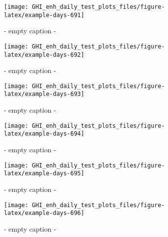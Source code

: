 \documentclass[
  10pt,
  a4paper,oneside]{article}
\begin{document}
\begin{figure}[H]

{\centering \texttt{[image: GHI\_enh\_daily\_test\_plots\_files/figure-latex/example-days-691]} 

}

\caption{ - empty caption - }\label{fig:example-days-691}
\end{figure}

\begin{figure}[H]

{\centering \texttt{[image: GHI\_enh\_daily\_test\_plots\_files/figure-latex/example-days-692]} 

}

\caption{ - empty caption - }\label{fig:example-days-692}
\end{figure}

\begin{figure}[H]

{\centering \texttt{[image: GHI\_enh\_daily\_test\_plots\_files/figure-latex/example-days-693]} 

}

\caption{ - empty caption - }\label{fig:example-days-693}
\end{figure}

\begin{figure}[H]

{\centering \texttt{[image: GHI\_enh\_daily\_test\_plots\_files/figure-latex/example-days-694]} 

}

\caption{ - empty caption - }\label{fig:example-days-694}
\end{figure}

\begin{figure}[H]

{\centering \texttt{[image: GHI\_enh\_daily\_test\_plots\_files/figure-latex/example-days-695]} 

}

\caption{ - empty caption - }\label{fig:example-days-695}
\end{figure}

\begin{figure}[H]

{\centering \texttt{[image: GHI\_enh\_daily\_test\_plots\_files/figure-latex/example-days-696]} 

}

\caption{ - empty caption - }\label{fig:example-days-696}
\end{figure}
\end{document}
